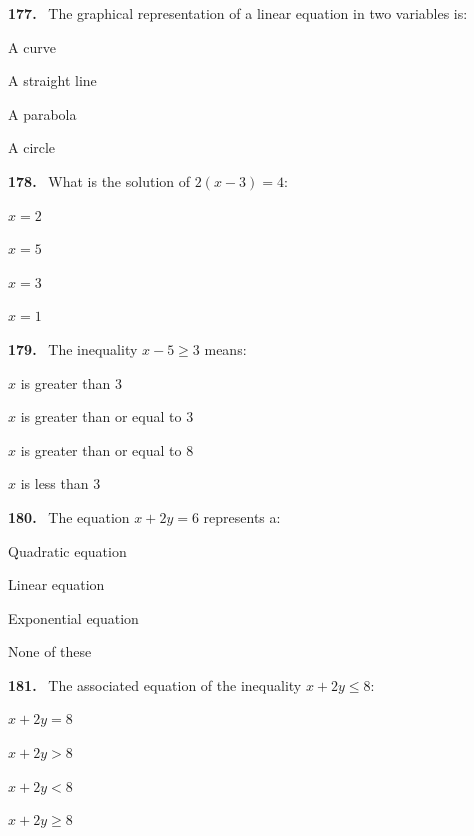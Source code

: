 \documentclass[11pt]{article}
\newenvironment{qenv}[1]{%
  \par\medskip\noindent\textbf{#1.}\ \ignorespaces
}{\par}
\begin{document}
\begin{qenv}{177} The graphical representation of a linear equation in two variables is:
\begin{options} \item A curve \item A straight line \item A parabola \item A circle \end{options} \end{qenv}

\begin{qenv}{178} What is the solution of $2(x-3)=4$:
\begin{options} \item $x=2$ \item $x=5$ \item $x=3$ \item $x=1$ \end{options} \end{qenv}

\begin{qenv}{179} The inequality $x-5 \geq 3$ means:
\begin{options} \item $x$ is greater than $3$ \item $x$ is greater than or equal to $3$ \item $x$ is greater than or equal to $8$ \item $x$ is less than $3$ \end{options} \end{qenv}

\begin{qenv}{180} The equation $x+2y=6$ represents a:
\begin{options} \item Quadratic equation \item Linear equation \item Exponential equation \item None of these \end{options} \end{qenv}

\begin{qenv}{181} The associated equation of the inequality $x+2y \leq 8$:
\begin{options} \item $x+2y=8$ \item $x+2y>8$ \item $x+2y<8$ \item $x+2y \geq 8$ \end{options} \end{qenv}
\end{document}
